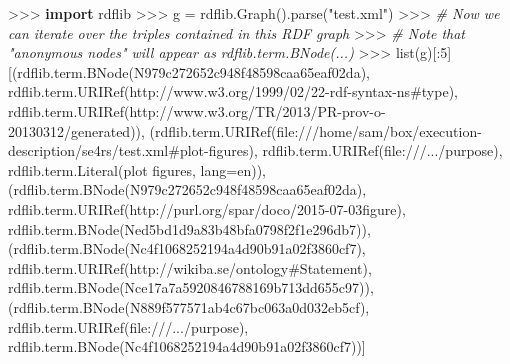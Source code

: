 \documentclass[manuscript,authordraft]{acmart}
\newenvironment{Shaded}{}{}
\newcommand{\BuiltInTok}[1]{\textcolor[rgb]{0.00,0.50,0.00}{#1}}
\newcommand{\CommentTok}[1]{\textcolor[rgb]{0.38,0.63,0.69}{\textit{#1}}}
\newcommand{\DecValTok}[1]{\textcolor[rgb]{0.25,0.63,0.44}{#1}}
\newcommand{\ImportTok}[1]{\textcolor[rgb]{0.00,0.50,0.00}{\textbf{#1}}}
\newcommand{\NormalTok}[1]{#1}
\newcommand{\OperatorTok}[1]{\textcolor[rgb]{0.40,0.40,0.40}{#1}}
\newcommand{\StringTok}[1]{\textcolor[rgb]{0.25,0.44,0.63}{#1}}
\begin{document}
\begin{Shaded}
\begin{Highlighting}[]
\OperatorTok{\textgreater{}\textgreater{}\textgreater{}} \ImportTok{import}\NormalTok{ rdflib}
\OperatorTok{\textgreater{}\textgreater{}\textgreater{}}\NormalTok{ g }\OperatorTok{=}\NormalTok{ rdflib.Graph().parse(}\StringTok{"test.xml"}\NormalTok{)}
\OperatorTok{\textgreater{}\textgreater{}\textgreater{}} \CommentTok{\# Now we can iterate over the triples contained in this RDF graph}
\OperatorTok{\textgreater{}\textgreater{}\textgreater{}} \CommentTok{\# Note that "anonymous nodes" will appear as rdflib.term.BNode(\textquotesingle{}...\textquotesingle{})}
\OperatorTok{\textgreater{}\textgreater{}\textgreater{}} \BuiltInTok{list}\NormalTok{(g)[:}\DecValTok{5}\NormalTok{]}
\NormalTok{[(rdflib.term.BNode(}\StringTok{\textquotesingle{}N979c272652c948f48598caa65eaf02da\textquotesingle{}}\NormalTok{),}
\NormalTok{  rdflib.term.URIRef(}\StringTok{\textquotesingle{}http://www.w3.org/1999/02/22{-}rdf{-}syntax{-}ns\#type\textquotesingle{}}\NormalTok{),}
\NormalTok{  rdflib.term.URIRef(}\StringTok{\textquotesingle{}http://www.w3.org/TR/2013/PR{-}prov{-}o{-}20130312/generated\textquotesingle{}}\NormalTok{)),}
\NormalTok{ (rdflib.term.URIRef(}\StringTok{\textquotesingle{}file:///home/sam/box/execution{-}description/se4rs/test.xml\#plot{-}figures\textquotesingle{}}\NormalTok{),}
\NormalTok{  rdflib.term.URIRef(}\StringTok{\textquotesingle{}file:///.../purpose\textquotesingle{}}\NormalTok{),}
\NormalTok{  rdflib.term.Literal(}\StringTok{\textquotesingle{}plot figures\textquotesingle{}}\NormalTok{, lang}\OperatorTok{=}\StringTok{\textquotesingle{}en\textquotesingle{}}\NormalTok{)),}
\NormalTok{ (rdflib.term.BNode(}\StringTok{\textquotesingle{}N979c272652c948f48598caa65eaf02da\textquotesingle{}}\NormalTok{),}
\NormalTok{  rdflib.term.URIRef(}\StringTok{\textquotesingle{}http://purl.org/spar/doco/2015{-}07{-}03figure\textquotesingle{}}\NormalTok{),}
\NormalTok{  rdflib.term.BNode(}\StringTok{\textquotesingle{}Ned5bd1d9a83b48bfa0798f2f1e296db7\textquotesingle{}}\NormalTok{)),}
\NormalTok{ (rdflib.term.BNode(}\StringTok{\textquotesingle{}Nc4f1068252194a4d90b91a02f3860cf7\textquotesingle{}}\NormalTok{),}
\NormalTok{  rdflib.term.URIRef(}\StringTok{\textquotesingle{}http://wikiba.se/ontology\#Statement\textquotesingle{}}\NormalTok{),}
\NormalTok{  rdflib.term.BNode(}\StringTok{\textquotesingle{}Nce17a7a5920846788169b713dd655c97\textquotesingle{}}\NormalTok{)),}
\NormalTok{ (rdflib.term.BNode(}\StringTok{\textquotesingle{}N889f577571ab4c67bc063a0d032eb5cf\textquotesingle{}}\NormalTok{),}
\NormalTok{  rdflib.term.URIRef(}\StringTok{\textquotesingle{}file:///.../purpose\textquotesingle{}}\NormalTok{),}
\NormalTok{  rdflib.term.BNode(}\StringTok{\textquotesingle{}Nc4f1068252194a4d90b91a02f3860cf7\textquotesingle{}}\NormalTok{))]}
\end{Highlighting}
\end{Shaded}




%


\end{document}
